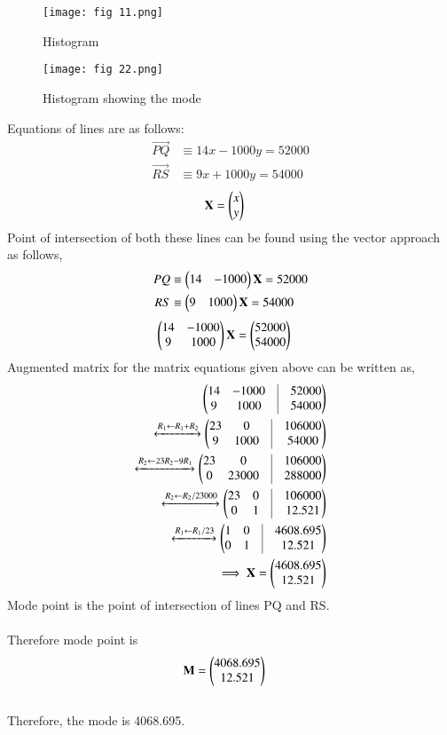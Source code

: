 \documentclass[journal,12pt,twocolumn]{IEEEtran}
\begin{document}
\begin{figure}[ht]
    \centering
    \texttt{[image: fig 11.png]}
    \caption{Histogram}
    \label{Fig 1.1}
\end{figure}
\begin{figure}[ht]
    \centering
    \texttt{[image: fig 22.png]}
    \caption{Histogram showing the mode}
    \label{}
\end{figure}
Equations of lines are as follows:\\
\begin{align}
    \vec{PQ} &\equiv 14x - 1000y =  52000 \\
    \vec{RS} &\equiv 9x + 1000y =  54000  
\end{align} 
\begin{align}    
     \mathbf{X} &= \begin{pmatrix}x \\ y\end{pmatrix}  
\end{align}
Point of intersection of both these lines can be found using the vector approach as follows,\\
\begin{align}
PQ &\equiv \begin{pmatrix}14 & -1000\end{pmatrix}\mathbf{X} = 52000\\
RS &\equiv \begin{pmatrix}9 & 1000\end{pmatrix}\mathbf{X} = 54000
\end{align}	
\begin{align}
\begin{pmatrix}14 & -1000 \\
		9 & 1000\end{pmatrix}\mathbf{X} &= \begin{pmatrix}52000 \\ 54000\end{pmatrix}
\end{align}	
Augmented matrix for the matrix equations given above can be written as,\\
\begin{align}
	\myvec{ 14 & -1000 & \vrule & 52000 \\
		9 & 1000 & \vrule & 54000} \\
	\xleftrightarrow[]{R_1 \leftarrow R_1+R_2}
		\myvec{ 23 & 0 & \vrule & 106000 \\
			9 & 1000 & \vrule & 54000} \\
	\xleftrightarrow[]{R_2 \leftarrow 23R_2-9R_1}
		\myvec{ 23 & 0 & \vrule & 106000 \\
			0 & 23000 &\vrule & 288000} \\
	\xleftrightarrow[]{R_2 \leftarrow R_2/23000}
		\myvec{ 23 & 0 & \vrule & 106000 \\
			0 & 1 & \vrule & 12.521} \\
	\xleftrightarrow[]{ R_1 \leftarrow R_1/23}
		\myvec{ 1 & 0 & \vrule & 4608.695 \\
			0 & 1 & \vrule & 12.521} \\
	\implies \vec{X} = \myvec{4608.695 \\ 12.521}
\end{align}
Mode point is the point of intersection of lines PQ and RS.\\\\
Therefore mode point is\\
\begin{align}
	\mathbf{M} &= \begin{pmatrix}4068.695 \\ 12.521\end{pmatrix}
\end{align}\\
Therefore, the mode is 4068.695.\\
\end{document}
